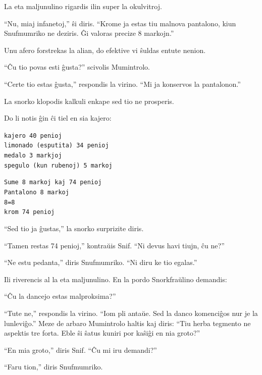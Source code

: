 La eta maljunulino rigardis ilin super la okulvitroj.

``Nu, miaj infanetoj,'' ŝi diris. ``Krome ja estas tiu malnova pantalono, kiun Snufmumriko ne deziris. Ĝi valoras precize 8 markojn.''

Unu afero forstrekas la alian, do efektive vi ŝuldas entute nenion.

``Ĉu tio povas esti ĝusta?'' scivolis Mumintrolo.

``Certe tio estas ĝusta,'' respondis la virino. ``Mi ja konservos la pantalonon.''

La snorko klopodis kalkuli enkape sed tio ne prosperis.

Do li notis ĝin ĉi tiel en sia kajero:

\begin{adjustbox}{minipage=0.5\textwidth,margin=10pt,center}\texttt{kajero	40 penioj\\
limonado (esputita)	34 penioj\\
medalo	3 markjoj\\
spegulo (kun rubenoj)	5 markoj\\}\end{adjustbox}

\begin{adjustbox}{minipage=0.5\textwidth,margin=10pt,center}\texttt{Sume 8 markoj kaj 74 penioj\\
Pantalono 8 markoj \\
8=8 \\
krom 74 penioj\\}\end{adjustbox}

``Sed tio ja ĝustas,'' la snorko surprizite diris.

``Tamen restas 74 penioj,'' kontraŭis Snif. ``Ni devus havi tiujn, ĉu ne?''

``Ne estu pedanta,'' diris Snufmumriko. ``Ni diru ke tio egalas.''

Ili riverencis al la eta maljunulino. En la pordo Snorkfraŭlino demandis:

``Ĉu la dancejo estas malproksima?''

``Tute ne,'' respondis la virino. ``Iom pli antaŭe. Sed la danco komenciĝos nur je la lunleviĝo.''
\sectionbreak
Meze de arbaro Mumintrolo haltis kaj diris: ``Tiu herba tegmento ne aspektis tre forta. Eble ŝi ŝatus kuniri por kaŝiĝi en nia groto?''

``En mia groto,'' diris Snif. ``Ĉu mi iru demandi?''

``Faru tion,'' diris Snufmumriko.

